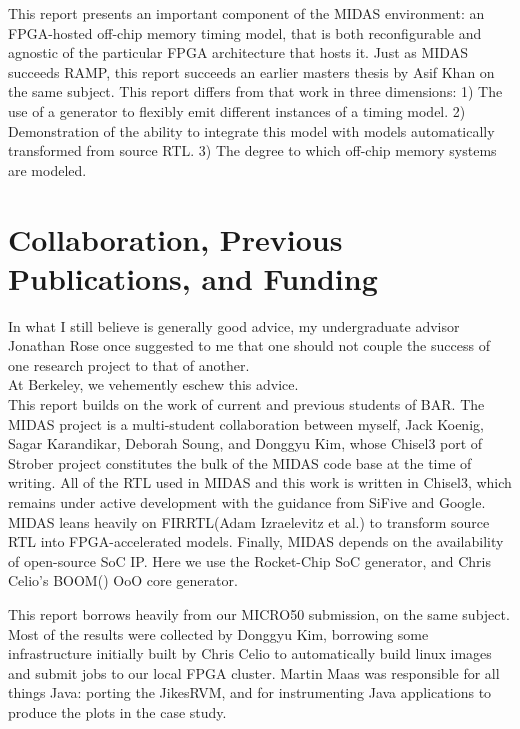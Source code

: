 This report presents an important component of the MIDAS environment: an
FPGA-hosted off-chip memory timing model, that is both reconfigurable and
agnostic of the particular FPGA architecture that hosts it. Just as MIDAS
succeeds RAMP, this report succeeds an earlier masters thesis by Asif
Khan\cite{khanmasters} on the same subject. This report differs from that work
in three dimensions: 1) The use of a generator to flexibly emit different
instances of a timing model. 2) Demonstration of the ability to integrate this
model with models automatically transformed from source RTL. 3) The degree to
which off-chip memory systems are modeled.

\section{Collaboration, Previous Publications, and Funding}

In what I still believe is generally good advice, my undergraduate advisor
Jonathan Rose once suggested to me that one should not couple the success of
one research project to that of another.\\

At Berkeley, we vehemently eschew this advice.\\

This report builds on the work of current and previous students of BAR.  The
MIDAS project is a multi-student collaboration between myself, Jack Koenig,
Sagar Karandikar, Deborah Soung, and Donggyu Kim, whose Chisel3 port of
Strober\cite{strober} project constitutes the bulk of the MIDAS code base at
the time of writing. All of the RTL used in MIDAS and this work is written in
Chisel3\cite{chisel}, which remains under active development with the guidance
from SiFive and Google. MIDAS leans heavily on FIRRTL\cite{firrtl}(Adam
Izraelevitz et al.) to transform source RTL into FPGA-accelerated models.
Finally, MIDAS depends on the availability of open-source SoC IP. Here we use
the Rocket-Chip\cite{rocketchip} SoC generator, and Chris Celio's
BOOM(\cite{boom}) OoO core generator.

This report borrows heavily from our MICRO50 submission, on the same subject.
Most of the results were collected by Donggyu Kim, borrowing some
infrastructure initially built by Chris Celio to automatically build linux
images and submit jobs to our local FPGA cluster. Martin Maas was responsible
for all things Java: porting the JikesRVM, and for instrumenting Java
applications to produce the plots in the case study.




